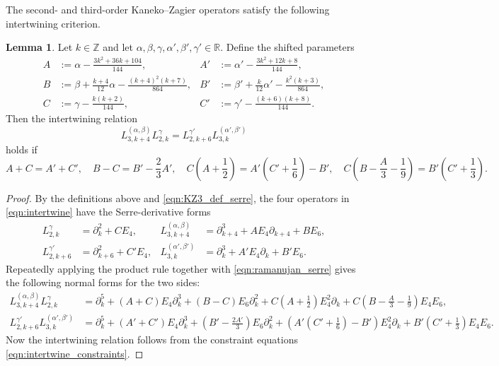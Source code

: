 \documentclass[10pt,reqno]{amsproc}
\newcommand{\bR}{\mathbb{R}}
\newcommand{\bZ}{\mathbb{Z}}
\newcommand{\1}{\mathds{1}}	%
\theoremstyle{definition}
\newtheorem{lemma}[theorem]{Lemma}
\theoremstyle{remark}
\begin{document}
The second- and third-order Kaneko--Zagier operators satisfy the following intertwining criterion.
\begin{lemma}
    \label{lem:intertwine}
    Let $k \in \bZ$ and let
    $\alpha,\beta,\gamma,\alpha',\beta',\gamma' \in \bR$.
    Define the shifted parameters
    \begin{align*}
        A &:= \alpha - \frac{3k^2+36k+104}{144}, &
        A' &:= \alpha' - \frac{3k^2+12k+8}{144}, \\
        B &:= \beta + \frac{k+4}{12}\alpha - \frac{(k+4)^2(k+7)}{864}, &
        B' &:= \beta' + \frac{k}{12}\alpha' - \frac{k^2(k+3)}{864}, \\
        C &:= \gamma - \frac{k(k+2)}{144}, &
        C' &:= \gamma' - \frac{(k+6)(k+8)}{144}.
    \end{align*}
    Then the intertwining relation
    \begin{equation}
        \label{eqn:intertwine}
        L_{3,k+4}^{(\alpha,\beta)} L_{2,k}^{\gamma} = L_{2,k+6}^{\gamma'} L_{3,k}^{(\alpha',\beta')}
    \end{equation}
    holds if
    \begin{equation}
        \label{eqn:intertwine_constraints}
        A+C = A'+C', \quad
        B-C = B'-\frac{2}{3}A', \quad
        C\left(A+\frac{1}{2}\right) = A'\left(C'+\frac{1}{6}\right)-B', \quad
        C\left(B-\frac{A}{3}-\frac{1}{9}\right) = B'\left(C'+\frac{1}{3}\right).
    \end{equation}
\end{lemma}
\begin{proof}
    By the definitions above and \eqref{eqn:KZ3_def_serre}, the four operators in \eqref{eqn:intertwine} have the Serre-derivative forms
    \begin{align*}
        L_{2,k}^{\gamma} &= \partial_k^2 + C E_4,
        &L_{3,k+4}^{(\alpha,\beta)} &= \partial_{k+4}^3 + A E_4\partial_{k+4} + B E_6, \\
        L_{2,k+6}^{\gamma'} &= \partial_{k+6}^2 + C' E_4,
        &L_{3,k}^{(\alpha',\beta')} &= \partial_k^3 + A' E_4\partial_k + B' E_6.
    \end{align*}
    Repeatedly applying the product rule together with \eqref{eqn:ramanujan_serre} gives the following normal forms for the two sides:
    \begin{align}
        L_{3,k+4}^{(\alpha,\beta)} L_{2,k}^{\gamma}
        &= \partial_k^5 +(A+C)E_4\partial_k^3 +(B-C)E_6\partial_k^2 + C\left(A+\frac{1}{2}\right)E_4^2\partial_k
        + C\left(B-\frac{A}{3}-\frac{1}{9}\right)E_4E_6, \label{eqn:intertwine_lhs} \\
        L_{2,k+6}^{\gamma'} L_{3,k}^{(\alpha',\beta')}
        &= \partial_k^5 +(A'+C')E_4\partial_k^3
        + \left(B'-\frac{2A'}{3}\right)E_6\partial_k^2 + \left(A'\left(C'+\frac{1}{6}\right)-B'\right)E_4^2\partial_k
        + B'\left(C'+\frac{1}{3}\right)E_4E_6. \label{eqn:intertwine_rhs}
    \end{align}
    Now the intertwining relation follows from the constraint equations \eqref{eqn:intertwine_constraints}.
\end{proof}
\end{document}
